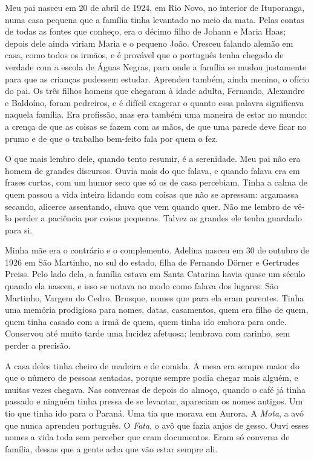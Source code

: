 \documentclass[
  brazilian,
  11pt,
  openany]{book}
\begin{document}
Meu pai nasceu em 20 de abril de 1924, em Rio Novo, no interior de
Ituporanga, numa casa pequena que a família tinha levantado no meio da
mata. Pelas contas de todas as fontes que conheço, era o décimo filho de
Johann e Maria Haas; depois dele ainda viriam Maria e o pequeno João.
Cresceu falando alemão em casa, como todos os irmãos, e é provável que o
português tenha chegado de verdade com a escola de Águas Negras, para
onde a família se mudou justamente para que as crianças pudessem
estudar. Aprendeu também, ainda menino, o ofício do pai. Os três filhos
homens que chegaram à idade adulta, Fernando, Alexandre e Baldoíno,
foram pedreiros, e é difícil exagerar o quanto essa palavra significava
naquela família. Era profissão, mas era também uma maneira de estar no
mundo: a crença de que as coisas se fazem com as mãos, de que uma parede
deve ficar no prumo e de que o trabalho bem-feito fala por quem o fez.

O que mais lembro dele, quando tento resumir, é a serenidade. Meu pai
não era homem de grandes discursos. Ouvia mais do que falava, e quando
falava era em frases curtas, com um humor seco que só os de casa
percebiam. Tinha a calma de quem passou a vida inteira lidando com
coisas que não se apressam: argamassa secando, alicerce assentando,
chuva que vem quando quer. Não me lembro de vê-lo perder a paciência por
coisas pequenas. Talvez as grandes ele tenha guardado para si.

Minha mãe era o contrário e o complemento. Adelina nasceu em 30 de
outubro de 1926 em São Martinho, no sul do estado, filha de Fernando
Dörner e Gertrudes Preiss. Pelo lado dela, a família estava em Santa
Catarina havia quase um século quando ela nasceu, e isso se notava no
modo como falava dos lugares: São Martinho, Vargem do Cedro, Brusque,
nomes que para ela eram parentes. Tinha uma memória prodigiosa para
nomes, datas, casamentos, quem era filho de quem, quem tinha casado com
a irmã de quem, quem tinha ido embora para onde. Conservou até muito
tarde uma lucidez afetuosa: lembrava com carinho, sem perder a precisão.

A casa deles tinha cheiro de madeira e de comida. A mesa era sempre
maior do que o número de pessoas sentadas, porque sempre podia chegar
mais alguém, e muitas vezes chegava. Nas conversas de depois do almoço,
quando o café já tinha passado e ninguém tinha pressa de se levantar,
apareciam os nomes antigos. Um tio que tinha ido para o Paraná. Uma tia
que morava em Aurora. A \emph{Mota}, a avó que nunca aprendeu português.
O \emph{Fata}, o avô que fazia anjos de gesso. Ouvi esses nomes a vida
toda sem perceber que eram documentos. Eram só conversa de família,
dessas que a gente acha que vão estar sempre ali.
\end{document}
